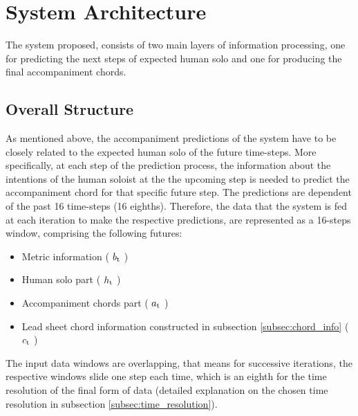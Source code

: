 
    
    \section{System Architecture}
    The system proposed, consists of two main layers of information processing, one for predicting the next steps of expected human solo and one for producing the final accompaniment chords.
        
        \subsection{Overall Structure} \label{subsec:overall_structure}
        As mentioned above, the accompaniment predictions of the system have to be closely related to the expected human solo of the future time-steps. More specifically, at each step of the prediction process, the information about the intentions of the human soloist at the the upcoming step is needed to predict the accompaniment chord for that specific future step. 
        The predictions are dependent of the past 16 time-steps (16 eighths). Therefore, the data that the system is fed at each iteration to make the respective predictions, are represented as a 16-steps window, comprising the following futures:
        \begin{itemize}

            \item   Metric information ( $b\textsubscript{t}$ )
            \item   Human solo part ( $h\textsubscript{t}$ )
            \item   Accompaniment chords part ( $a\textsubscript{t}$ )
            \item   Lead sheet chord information constructed in subsection \ref{subsec:chord_info} ( $c\textsubscript{t}$ )
            
        \end{itemize}

        The input data windows are overlapping, that means for successive iterations, the respective windows slide one step each time, which is an eighth for the time resolution of the final form of data (detailed explanation on the chosen time resolution in subsection \ref{subsec:time_resolution}).
        
